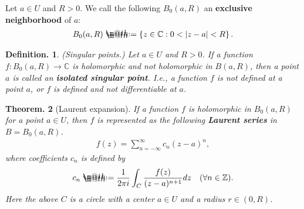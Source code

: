 \documentclass[openany, a4paper, oneside]{book}
\makeatletter
\newcommand*{\defeq}{\mathrel{\rlap{%
\raisebox{0.3ex}{$\m@th\cdot$}}%
\raisebox{-0.3ex}{$\m@th\cdot$}}%
=}
\theoremstyle{break}
\newtheorem{thm}{Theorem.}[section]
\theoremstyle{breakdefn}
\newtheorem{defn}[thm]{Definition.}
\newcommand{\abs}[1]{\left|#1\right|}
\newcommand{\set}[2]{\left\{#1 : #2\right\}}
\newcommand{\bbC}{\mathbb{C}}
\newcommand{\bbZ}{\mathbb{Z}}
\newcommand{\upbf}[1]{\textup{\textbf{#1}}}
\makeatother
\begin{document}
Let $a \in U$ and $R > 0$.
We call the following $B_0 (a, R)$ an \textbf{exclusive neighborhood} of $a$:
\begin{align}
 B_0 (a, R)
 \defeq
 \set{z \in \bbC}{ 0 < \abs{z - a} < R}.
\end{align}
\begin{defn}\textup{(Singular points.)}
 Let $a \in U$ and $R > 0$.
 If a function $f \colon B_0 (a, R) \to \bbC$ is holomorphic and not holomorphic in $B (a, R)$,
 then a point $a$ is called an \upbf{isolated singular point}.
 I.e., a function $f$ is not defined at a point $a$, or $f$ is defined and not differentiable at $a$.
\end{defn}
\begin{thm}[Laurent expansion]
 If a function $f$ is holomorphic in $B_0 (a, R)$ for a point $a \in U$, then
 $f$ is represented as the following \upbf{Laurent series} in $B = B_0 (a, R)$.
 \begin{align}
  f (z)
  =
  \sum_{n= - \infty}^{\infty} c_n (z-a)^n,
 \end{align}
 where coefficients $c_n$ is defined by
 \begin{align}
  c_n
  \defeq
  \frac{1}{2 \pi i} \int_C \frac{f (z)}{(z - a)^{n+1}} dz \quad (\forall n \in \bbZ).
 \end{align}
 Here the above $C$ is a circle with a center $a \in U$ and a radius $r \in (0, R)$.
\end{thm}
\end{document}
